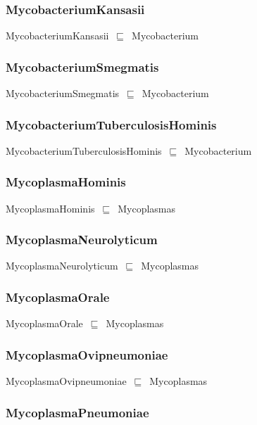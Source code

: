 \documentclass{article}
\begin{document}
\subsubsection*{MycobacteriumKansasii}

MycobacteriumKansasii~\ensuremath{\sqsubseteq}~Mycobacterium~

\subsubsection*{MycobacteriumSmegmatis}

MycobacteriumSmegmatis~\ensuremath{\sqsubseteq}~Mycobacterium~

\subsubsection*{MycobacteriumTuberculosisHominis}

MycobacteriumTuberculosisHominis~\ensuremath{\sqsubseteq}~Mycobacterium~

\subsubsection*{MycoplasmaHominis}

MycoplasmaHominis~\ensuremath{\sqsubseteq}~Mycoplasmas~

\subsubsection*{MycoplasmaNeurolyticum}

MycoplasmaNeurolyticum~\ensuremath{\sqsubseteq}~Mycoplasmas~

\subsubsection*{MycoplasmaOrale}

MycoplasmaOrale~\ensuremath{\sqsubseteq}~Mycoplasmas~

\subsubsection*{MycoplasmaOvipneumoniae}

MycoplasmaOvipneumoniae~\ensuremath{\sqsubseteq}~Mycoplasmas~

\subsubsection*{MycoplasmaPneumoniae}
\end{document}
